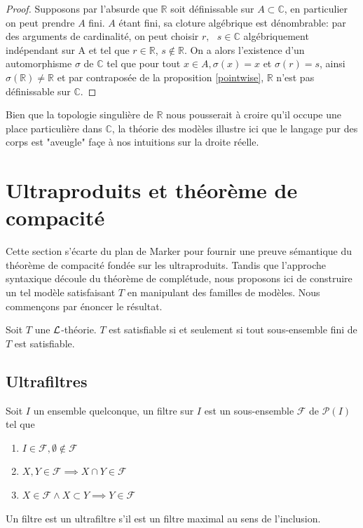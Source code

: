 \begin{proof}
Supposons par l'absurde que $\mathbb{R}$ soit définissable sur $A \subset \mathbb{C}$, en particulier on peut prendre $A$ fini.
$A$ étant fini, sa cloture algébrique est dénombrable: par des arguments de cardinalité, on peut choisir $r,\text{ }s \in \mathbb{C}$ 
algébriquement indépendant sur A et tel que $r \in \mathbb{R}$, $s \not\in \mathbb{R}$.
On a alors l'existence d'un automorphisme $\sigma$ de $\mathbb{C}$ tel que pour tout $x \in A, \sigma(x)=x$ et $\sigma(r)=s$,
ainsi $\sigma(\mathbb{R}) \neq \mathbb{R}$ et par contraposée de la proposition \ref{pointwise}, $\mathbb{R}$ n'est pas définissable sur $\mathbb{C}$.
\end{proof}

\begin{rema}
Bien que la topologie singulière de $\mathbb{R}$ nous pousserait à croire qu'il occupe une place particulière dans $\mathbb{C}$, la théorie des modèles
illustre ici que le langage pur des corps est "aveugle" façe à nos intuitions sur la droite réelle.
\end{rema}

\section{Ultraproduits et théorème de compacité}

\noindent Cette section s'écarte du plan de Marker pour fournir une preuve sémantique du théorème de compacité fondée sur les ultraproduits.
Tandis que l'approche syntaxique découle du théorème de complétude, nous proposons ici de construire un tel modèle satisfaisant $T$ en manipulant des familles de modèles.
Nous commençons par énoncer le résultat.

\begin{theo*}
Soit $T$ une $\mathcal{L}$-théorie. $T$ est satisfiable si et seulement si tout sous-ensemble fini de $T$ est satisfiable.
\end{theo*}

\subsection{Ultrafiltres}

\begin{defi}
Soit $I$ un ensemble quelconque, un filtre sur $I$ est un sous-ensemble $\mathcal{F}$ de $\mathcal{P}(I)$ tel que 
\begin{enumerate}
\item $I \in \mathcal{F}, \emptyset \not\in \mathcal{F}$
\item $X, Y \in \mathcal{F} \implies X \cap Y \in \mathcal{F}$
\item $X \in \mathcal{F} \wedge X \subset Y \implies Y \in \mathcal{F}$
\end{enumerate}
Un filtre est un ultrafiltre s'il est un filtre maximal au sens de l'inclusion.
\end{defi}

